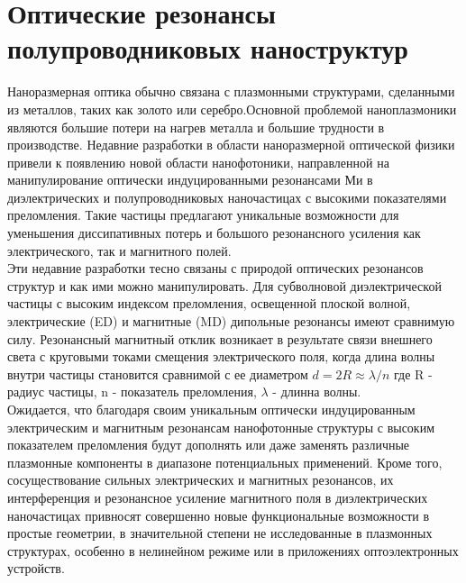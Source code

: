 \section{Оптические резонансы полупроводниковых наноструктур}
\hspace*{2mm}Наноразмерная оптика обычно связана с плазмонными структурами, сделанными из металлов, таких как золото или серебро.Основной проблемой наноплазмоники являются большие потери на нагрев металла и большие трудности в производстве. Недавние разработки в области наноразмерной оптической физики привели к появлению новой области нанофотоники, направленной на манипулирование оптически индуцированными резонансами Ми в диэлектрических и полупроводниковых наночастицах с высокими показателями преломления. Такие частицы предлагают уникальные возможности для уменьшения диссипативных потерь и большого резонансного усиления как электрического, так и магнитного полей. 
\\
\hspace*{2mm}
Эти недавние разработки тесно связаны с природой оптических резонансов структур и как ими можно манипулировать. Для субволновой диэлектрической частицы с высоким индексом преломления, освещенной плоской волной, электрические (ED) и магнитные (MD) дипольные резонансы имеют сравнимую силу. Резонансный магнитный отклик возникает в результате связи внешнего света с круговыми токами смещения электрического поля, когда длина волны внутри частицы становится сравнимой с ее диаметром $d = 2R \approx \lambda/n$ где R - радиус частицы, n - показатель преломления, $\lambda$ - длинна волны.
\\
\hspace*{2mm}
Ожидается, что благодаря своим уникальным оптически индуцированным электрическим и магнитным резонансам нанофотонные структуры с высоким показателем преломления будут дополнять или даже заменять различные плазмонные компоненты в диапазоне потенциальных применений. Кроме того, сосуществование сильных электрических и магнитных резонансов, их интерференция и резонансное усиление магнитного поля в диэлектрических наночастицах привносят совершенно новые функциональные возможности в простые геометрии, в значительной степени не исследованные в плазмонных структурах, особенно в нелинейном режиме или в приложениях оптоэлектронных устройств. 

